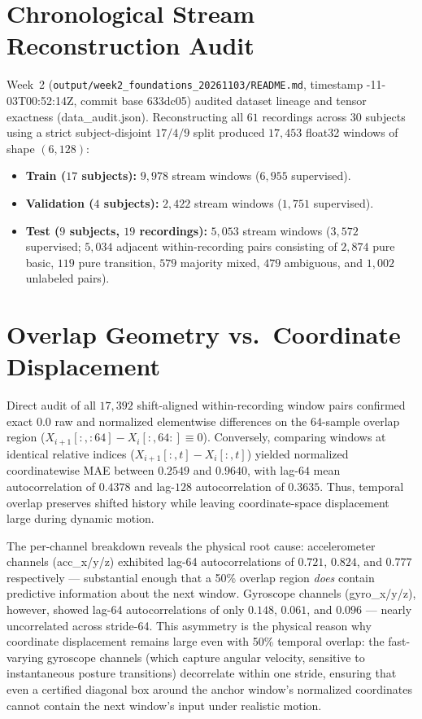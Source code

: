 \documentclass[11pt,oneside,a4paper]{report}
\newcommand{\code}[1]{{\small\upshape\ttfamily #1}}
\theoremstyle{remark}
\begin{document}
\section{Chronological Stream Reconstruction Audit}
Week~2 (\nolinkurl{output/week2_foundations_20261103/README.md}, timestamp \code{2026-11-03T00:52:14Z}, commit base \code{633dc05}) audited dataset lineage and tensor exactness (\code{data\_audit.json}). Reconstructing all $61$ recordings across $30$ subjects using a strict subject-disjoint $17/4/9$ split produced $17,453$ \code{float32} windows of shape $(6, 128)$:
\begin{itemize}[leftmargin=1.5em]
  \item \textbf{Train ($17$ subjects):} $9,978$ stream windows ($6,955$ supervised).
  \item \textbf{Validation ($4$ subjects):} $2,422$ stream windows ($1,751$ supervised).
  \item \textbf{Test ($9$ subjects, $19$ recordings):} $5,053$ stream windows ($3,572$ supervised; $5,034$ adjacent within-recording pairs consisting of $2,874$ pure basic, $119$ pure transition, $579$ majority mixed, $479$ ambiguous, and $1,002$ unlabeled pairs).
\end{itemize}

\section{Overlap Geometry vs.\ Coordinate Displacement}
Direct audit of all $17{,}392$ shift-aligned within-recording window pairs confirmed exact $0.0$ raw and normalized elementwise differences on the $64$-sample overlap region ($X_{i+1}[:, :64] - X_i[:, 64:] \equiv 0$). Conversely, comparing windows at identical relative indices ($X_{i+1}[:, t] - X_i[:, t]$) yielded normalized coordinatewise MAE between $0.2549$ and $0.9640$, with lag-$64$ mean autocorrelation of $0.4378$ and lag-$128$ autocorrelation of $0.3635$. Thus, temporal overlap preserves shifted history while leaving coordinate-space displacement large during dynamic motion.

The per-channel breakdown reveals the physical root cause: accelerometer channels (\code{acc\_x/y/z}) exhibited lag-64 autocorrelations of $0.721$, $0.824$, and $0.777$ respectively --- substantial enough that a 50\% overlap region \emph{does} contain predictive information about the next window. Gyroscope channels (\code{gyro\_x/y/z}), however, showed lag-64 autocorrelations of only $0.148$, $0.061$, and $0.096$ --- nearly uncorrelated across stride-64. This asymmetry is the physical reason why coordinate displacement remains large even with 50\% temporal overlap: the fast-varying gyroscope channels (which capture angular velocity, sensitive to instantaneous posture transitions) decorrelate within one stride, ensuring that even a certified diagonal box around the anchor window's normalized coordinates cannot contain the next window's input under realistic motion.
\end{document}
